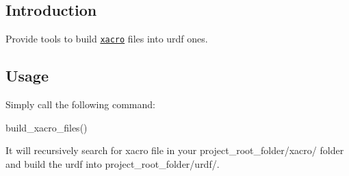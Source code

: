 \subsection*{Introduction}

Provide tools to build \href{http://wiki.ros.org/xacro}{\tt xacro} files into urdf ones.

\subsection*{Usage}

Simply call the following command\+: \begin{DoxyVerb}build_xacro_files()
\end{DoxyVerb}


It will recursively search for xacro file in your {\ttfamily project\+\_\+root\+\_\+folder/xacro/} folder and build the urdf into {\ttfamily project\+\_\+root\+\_\+folder/urdf/}. 